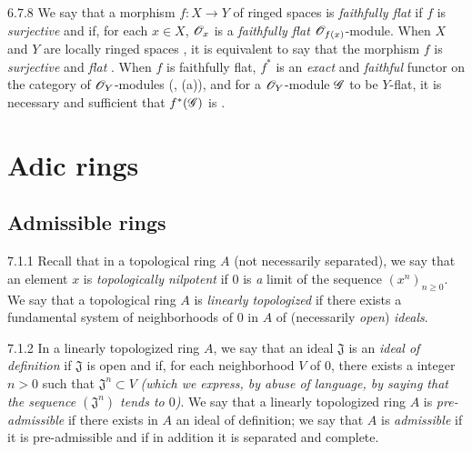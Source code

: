 \begin{env}{6.7.8}
\label{env-0.6.7.8}
We say that a morphism $f:X\to Y$ of ringed spaces is \emph{faithfully flat} if $f$ is
\emph{surjective} and if, for each $x\in X$, $\mathscr{O}_x$ is a \emph{faithfully flat}
$\mathscr{O}_{f(x)}$-module. When $X$ and $Y$ are locally ringed spaces , it is
equivalent to say that the morphism $f$ is \emph{surjective} and \emph{flat}
. When $f$ is faithfully flat, $f^*$ is an \emph{exact} and \emph{faithful}
functor on the category of $\mathscr{O}_Y$-modules (, (a)), and for a $\mathscr{O}_Y$-module
$\mathscr{G}$ to be $Y$-flat, it is necessary and sufficient that $f^*(\mathscr{G})$ is
.
\end{env}

\section{Adic rings}
\label{0-prelim-7}

\subsection{Admissible rings}
\label{0-prelim-7.1}

\begin{env}{7.1.1}
\label{env-0.7.1.1}
Recall that in a topological ring $A$ (not necessarily separated), we say that an element $x$
is \emph{topologically nilpotent} if $0$ is \emph{a} limit of the sequence
$(x^n)_{n\geqslant 0}$. We say that a topological ring $A$ is \emph{linearly topologized} if
there exists a fundamental system of neighborhoods of $0$ in $A$ of (necessarily \emph{open})
\emph{ideals}.
\end{env}

\begin{envs}[Definition]{7.1.2}
\label{defn-0.7.1.2}
In a linearly topologized ring $A$, we say that an ideal $\mathfrak{J}$ is an \emph{ideal of
definition} if $\mathfrak{J}$ is open and if, for each neighborhood $V$ of $0$, there exists
a integer $n>0$ such
that $\mathfrak{J}^n\subset V$ \emph{(which we express, by abuse of language, by saying that
the sequence $(\mathfrak{J}^n)$ \emph{tends to $0$})}. We say that a linearly topologized
ring $A$ is \emph{pre-admissible} if there exists in $A$ an ideal of definition; we say that
$A$ is \emph{admissible} if it is pre-admissible and if in addition it is separated and
complete.
\end{envs}

